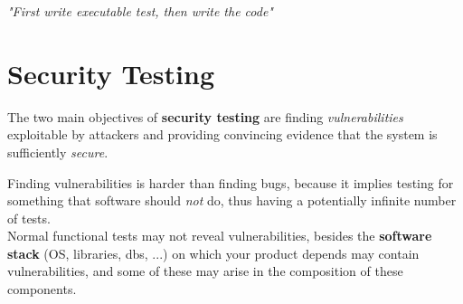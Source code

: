 \begin{theorem}
\textit{"First write executable test, then write the code"}
\end{theorem}



\section{Security Testing}
The two main objectives of \textbf{security testing} are finding \textit{vulnerabilities} exploitable by attackers and providing convincing evidence that the system is sufficiently \textit{secure}.

Finding vulnerabilities is harder than finding bugs, because it implies testing for something that software should \textit{not} do,
thus having a potentially infinite
number of tests.\\
Normal functional tests may not reveal vulnerabilities, besides
the \textbf{software stack} (OS, libraries, dbs, ...) on which your product depends may contain vulnerabilities,
and some of these may arise in the composition of these components.


